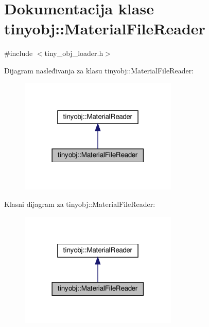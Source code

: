 \hypertarget{classtinyobj_1_1MaterialFileReader}{}\section{Dokumentacija klase tinyobj\+:\+:Material\+File\+Reader}
\label{classtinyobj_1_1MaterialFileReader}


{\ttfamily \#include $<$tiny\+\_\+obj\+\_\+loader.\+h$>$}



Dijagram nasleđivanja za klasu tinyobj\+:\+:Material\+File\+Reader\+:
\nopagebreak
\begin{figure}[H]
\begin{center}
\leavevmode
\includegraphics[width=213pt]{classtinyobj_1_1MaterialFileReader__inherit__graph}
\end{center}
\end{figure}


Klasni dijagram za tinyobj\+:\+:Material\+File\+Reader\+:
\nopagebreak
\begin{figure}[H]
\begin{center}
\leavevmode
\includegraphics[width=213pt]{classtinyobj_1_1MaterialFileReader__coll__graph}
\end{center}
\end{figure}
